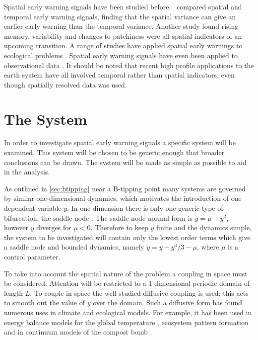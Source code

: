 Spatial early warning signals have been studied before.~\cite{Donangelo2010} compared spatial and temporal early warning signals, finding that the spatial variance
can give an earlier early warning than the temporal variance. Another study \parencite{Kefi2014} found rising memory, variability and changes to patchiness were all
spatial indicators of an upcoming transition. A range of studies have applied spatial early warnings to ecological problems \parencite{Carpenter2010,Dakos2011,Guttal2009}.
Spatial early warning signals have even been applied to observational data \parencite{Tirabassi2023,Kefi2007,Eby2017}. It should be noted that recent high profile applications to
the earth system \parencite{Boulton2022,Boers2021,Boers2021a} have all involved temporal rather than spatial indicators, even though spatially resolved data was used.

\section{The System}
In order to investigate spatial early warning signals a specific system will be examined. This system will be chosen
to be generic enough that broader conclusions can be drawn. The system will be made as simple as possible to aid in the analysis.

As outlined in \cref{sec:btipping} near a B-tipping point many systems are governed by similar one-dimensional dynamics, which motivates the introduction of one dependent
variable $y$. In one dimension there is only one generic type of bifurcation, the saddle node \parencite{Thompson1994}. The saddle node normal form is
$\dot{y} = \mu - y^2$, however $y$ diverges for $\mu < 0$. Therefore to keep $y$ finite and the dynamics simple, the system to be investigated will contain only the lowest order terms
which give a saddle node and bounded dynamics, namely $\dot{y} = y - y^3/3 - \mu$, where $\mu$ is a control parameter.

To take into account the spatial nature of the problem a coupling in space must be considered. Attention will be restricted to a 1 dimensional
periodic domain of length $L$. To couple in space the well studied diffusive coupling is used; this acts to smooth out the value of $y$ over the domain.
Such a diffusive form has found numerous uses in climate and ecological models. For example, it has been used in energy balance models for
the global temperature \parencite{Ghil1976}, ecosystem pattern formation \parencite{Gowda2014,Bastiaansen2018} and in continuum models of the compost bomb \parencite{Clarke2021}.

